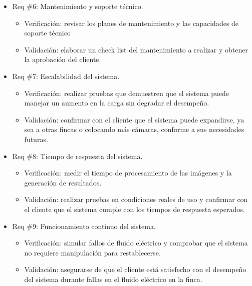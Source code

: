 \documentclass[
11pt, %
]{charter}
\begin{document}
\begin{itemize} 
\item Req \#6: Mantenimiento y soporte técnico.
	\begin{itemize}
	\item Verificación: revisar los planes de mantenimiento y las capacidades de soporte técnico
	\item Validación: elaborar un check list del mantenimiento a realizar y obtener la aprobación del cliente.
	\end{itemize}
\end{itemize}

\begin{itemize} 
\item Req \#7: Escalabilidad del sistema.
	\begin{itemize}
	\item Verificación: realizar pruebas que demuestren que el sistema puede manejar un aumento en la carga sin degradar el desempeño.
	\item Validación: confirmar con el cliente que el sistema puede expandirse, ya sea a otras fincas o colocando más cámaras, conforme a sus necesidades futuras.
	\end{itemize}
\end{itemize}

\begin{itemize} 
\item Req \#8: Tiempo de respuesta del sistema.
	\begin{itemize}
	\item Verificación: medir el tiempo de procesamiento de las imágenes y la generación de resultados. 
	\item Validación: realizar pruebas en condiciones reales de uso y confirmar con el cliente que el sistema cumple con los tiempos de respuesta esperados.
	\end{itemize}
\end{itemize}

\begin{itemize} 
\item Req \#9: Funcionamiento continuo del sistema.
	\begin{itemize}
	\item Verificación: simular fallos de fluido eléctrico y comprobar que el sistema no requiere manipulación para restablecerse.
	\item Validación: asegurarse de que el cliente está satisfecho con el desempeño del sistema durante fallas en el fluido eléctrico  en la finca.
	\end{itemize}
\end{itemize}
\end{document}
